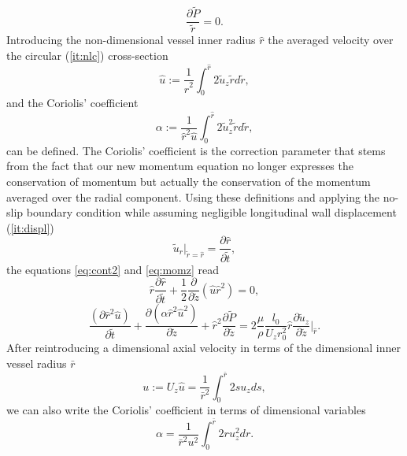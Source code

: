 \documentclass[a4paper, oneside]{discothesis}
\begin{document}
\begin{equation}
	\frac{\partial \tilde{P}}{\tilde{r}} = 0.
\end{equation}
Introducing the non-dimensional vessel inner radius $\hat r$ the averaged velocity over the circular (\autoref{it:nlc}) cross-section
\begin{equation}
	\hat{u} := \frac{1}{\hat{r}^2} \int_0^{\hat{r}} 2 \tilde{u}_z \tilde{r} d\tilde{r},
\end{equation}
and the Coriolis' coefficient
\begin{equation}
	\alpha := \frac{1}{\hat{r}^2 \hat{u}} \int_0^{\hat{r}} 2 \tilde{u}_z^2 \tilde{r} d\tilde{r},
\end{equation}
can be defined.
The Coriolis' coefficient is the correction parameter that stems from the fact that our new momentum equation no longer expresses the conservation of momentum but actually the conservation of the momentum averaged over the radial component.\cite{article10002407}
Using these definitions and applying the no-slip boundary condition while assuming negligible longitudinal wall displacement (\autoref{it:displ})
\begin{equation}
	\tilde{u}_r|_{\tilde{r}=\hat{r}} = \frac{\partial \hat{r}}{\partial \tilde{t}},
\end{equation}
the equations \autoref{eq:cont2} and \autoref{eq:momz} read
\begin{equation}
	\hat{r} \frac{\partial \hat{r}}{\partial \tilde{t}} + \frac{1}{2}\frac{\partial}{\partial \tilde{z}} \left(  \hat{u}\hat{r}^2 \right) = 0, \label{eq:cont3}
\end{equation}
\begin{equation}
	\frac{(\partial \hat{r}^2 \hat{u})}{\partial \tilde{t}} + \frac{\partial \left( \alpha \hat{r}^2 \hat{u}^2 \right)}{\partial \tilde{z}} + \hat{r}^2 \frac{\partial \tilde{P}}{\partial \tilde{z}} = 2\frac{\mu}{\rho} \frac{l_0}{U_z r_0^2} \hat{r} \frac{\partial \tilde{u}_z}{\partial \tilde{z}} |_{\hat{r}}.\label{eq:momz1}
\end{equation}
After reintroducing a dimensional axial velocity in terms of the dimensional inner vessel radius $\bar{r}$
\begin{equation}
	u := U_z \hat{u} = \frac{1}{\bar{r}^2} \int_0^{\bar{r}} 2su_zds,
\end{equation}
we can also write the Coriolis' coefficient in terms of dimensional variables
\begin{equation}
	\alpha = \frac{1}{\bar{r}^2 u^2} \int_0^{\bar{r}} 2ru_z^2dr.
\end{equation}
\end{document}
